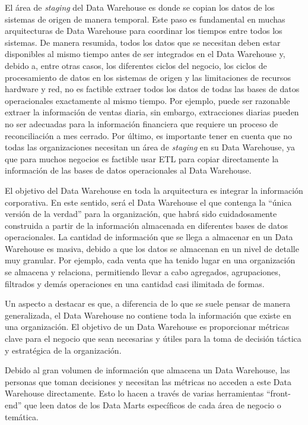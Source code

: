 \documentclass[a4paper, 12pt]{book}
\begin{document}
El área de \textit{staging} del Data Warehouse es donde se copian los datos de los sistemas de origen de manera temporal. Este paso es fundamental en muchas arquitecturas de Data Warehouse para coordinar los tiempos entre todos los sistemas. De manera resumida, todos los datos que se necesitan deben estar disponibles al mismo tiempo antes de ser integrados en el Data Warehouse y, debido a, entre otras casos, los diferentes ciclos del negocio, los ciclos de procesamiento de datos en los sistemas de origen y las limitaciones de recursos hardware y red, no es factible extraer todos los datos de todas las bases de datos operacionales exactamente al mismo tiempo. Por ejemplo, puede ser razonable extraer la información de ventas diaria, sin embargo, extracciones diarias pueden no ser adecuadas para la información financiera que requiere un proceso de reconciliación a mes cerrado. Por último, es importante tener en cuenta que no todas las organizaciones necesitan un área de \textit{staging} en su Data Warehouse, ya que para muchos negocios es factible usar ETL para copiar directamente la información de las bases de datos operacionales al Data Warehouse.

El objetivo del Data Warehouse en toda la arquitectura es integrar la información corporativa. En este sentido, será el Data Warehouse el que contenga la “única versión de la verdad” para la organización, que habrá sido cuidadosamente construida a partir de la información almacenada en diferentes bases de datos operacionales. La cantidad de información que se llega a almacenar en un Data Warehouse es masiva, debido a que los datos se almacenan en un nivel de detalle muy granular. Por ejemplo, cada venta que ha tenido lugar en una organización se almacena y relaciona, permitiendo llevar a cabo agregados, agrupaciones, filtrados y demás operaciones en una cantidad casi ilimitada de formas.

Un aspecto a destacar es que, a diferencia de lo que se suele pensar de manera generalizada, el Data Warehouse no contiene toda la información que existe en una organización. El objetivo de un Data Warehouse es proporcionar métricas clave para el negocio que sean necesarias y útiles para la toma de decisión táctica y estratégica de la organización.

Debido al gran volumen de información que almacena un Data Warehouse, las personas que toman decisiones y necesitan las métricas no acceden a este Data Warehouse directamente. Esto lo hacen a través de varias herramientas “front-end” que leen datos de los Data Marts específicos de cada área de negocio o temática.
\end{document}
